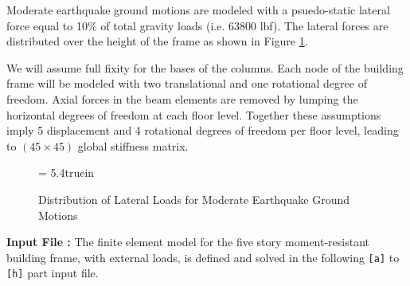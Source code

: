 \vspace{0.15 in}
\noindent\hspace{0.5 in}
Moderate earthquake ground motions are modeled with a psuedo-static
lateral force equal to 10\% of total gravity loads (i.e. 63800 lbf).
The lateral forces are distributed over the height of the frame as
shown in Figure \ref{fig: five-story-building-load-distribution}.

\vspace{0.15 in}
\noindent\hspace{0.5 in}
We will assume full fixity for the bases of the columns.
Each node of the building frame will be modeled with
two translational and one rotational degree of freedom.
Axial forces in the beam elements are removed by
lumping the horizontal degrees of freedom at each floor level.
Together these assumptions imply 5 displacement and 4 rotational
degrees of freedom per floor level,
leading to $(45 \times 45)$ global stiffness matrix.

\begin{figure}[ht]
\vspace{0.15 in}
\epsfxsize= 5.4truein
\centerline{}
\caption{Distribution of Lateral Loads for Moderate Earthquake Ground Motions}
\label{fig: five-story-building-load-distribution}
\end{figure}

\vspace{0.15 in}\noindent
{\bf Input File :}
The finite element model for the five story moment-resistant building
frame, with external loads, is defined and solved in
the following {\tt [a]} to {\tt [h]} part input file.

